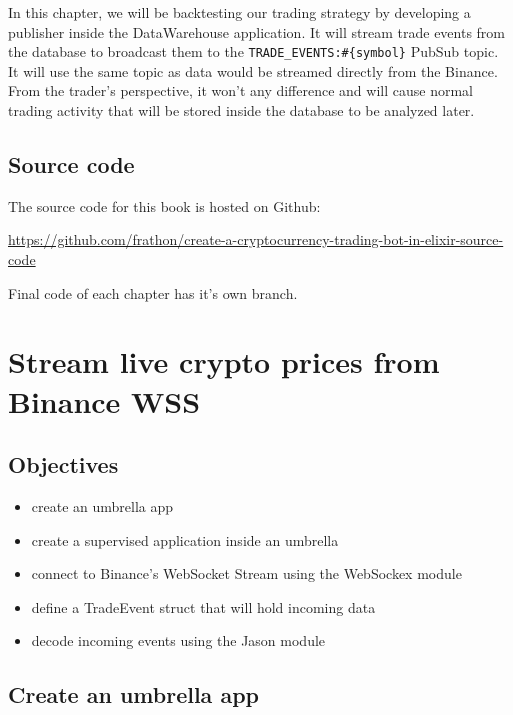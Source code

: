 \documentclass[
]{book}
\providecommand{\tightlist}{%
  \setlength{\itemsep}{0pt}\setlength{\parskip}{0pt}}
\begin{document}
In this chapter, we will be backtesting our trading strategy by developing a publisher inside the DataWarehouse application. It will stream trade events from the database to broadcast them to the \texttt{TRADE\_EVENTS:\#\{symbol\}} PubSub topic. It will use the same topic as data would be streamed directly from the Binance. From the trader's perspective, it won't any difference and will cause normal trading activity that will be stored inside the database to be analyzed later.

\hypertarget{source-code}{%
\section*{Source code}\label{source-code}}

The source code for this book is hosted on Github:

\url{https://github.com/frathon/create-a-cryptocurrency-trading-bot-in-elixir-source-code}

Final code of each chapter has it's own branch.

\hypertarget{stream-live-crypto-prices-from-binance-wss}{%
\chapter{Stream live crypto prices from Binance WSS}\label{stream-live-crypto-prices-from-binance-wss}}

\hypertarget{objectives}{%
\section{Objectives}\label{objectives}}

\begin{itemize}
\tightlist
\item
  create an umbrella app
\item
  create a supervised application inside an umbrella
\item
  connect to Binance's WebSocket Stream using the WebSockex module
\item
  define a TradeEvent struct that will hold incoming data
\item
  decode incoming events using the Jason module
\end{itemize}

\hypertarget{create-an-umbrella-app}{%
\section{Create an umbrella app}\label{create-an-umbrella-app}}
\end{document}
